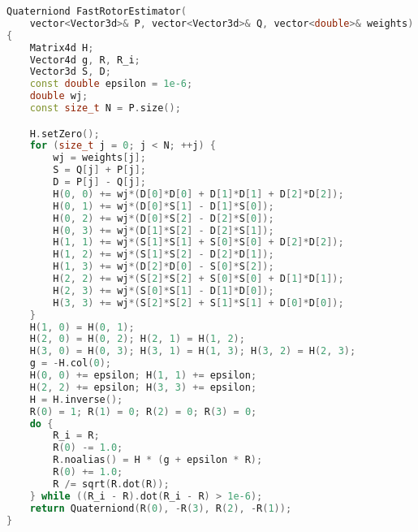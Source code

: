 \documentclass{birkjour}
\numberwithin{equation}{section}
\begin{document}
\begin{lstlisting}[language=C++, caption=C++ code for rotor estimation, basicstyle=\tiny, keywordstyle=\bfseries, label=lst:cppcode, morekeywords={Matrix4d,Vector4d,Vector3d,Quaterniond,sqrt}]
Quaterniond FastRotorEstimator(
	vector<Vector3d>& P, vector<Vector3d>& Q, vector<double>& weights)
{
	Matrix4d H;
	Vector4d g, R, R_i;
	Vector3d S, D;
	const double epsilon = 1e-6;
	double wj;
	const size_t N = P.size();

	H.setZero();
	for (size_t j = 0; j < N; ++j) {
		wj = weights[j];
		S = Q[j] + P[j];
		D = P[j] - Q[j];
		H(0, 0) += wj*(D[0]*D[0] + D[1]*D[1] + D[2]*D[2]);
		H(0, 1) += wj*(D[0]*S[1] - D[1]*S[0]);
		H(0, 2) += wj*(D[0]*S[2] - D[2]*S[0]);
		H(0, 3) += wj*(D[1]*S[2] - D[2]*S[1]);
		H(1, 1) += wj*(S[1]*S[1] + S[0]*S[0] + D[2]*D[2]);
		H(1, 2) += wj*(S[1]*S[2] - D[2]*D[1]);
		H(1, 3) += wj*(D[2]*D[0] - S[0]*S[2]);
		H(2, 2) += wj*(S[2]*S[2] + S[0]*S[0] + D[1]*D[1]);
		H(2, 3) += wj*(S[0]*S[1] - D[1]*D[0]);
		H(3, 3) += wj*(S[2]*S[2] + S[1]*S[1] + D[0]*D[0]);
	}
	H(1, 0) = H(0, 1);
	H(2, 0) = H(0, 2); H(2, 1) = H(1, 2);
	H(3, 0) = H(0, 3); H(3, 1) = H(1, 3); H(3, 2) = H(2, 3);
	g = -H.col(0);
	H(0, 0) += epsilon; H(1, 1) += epsilon; 
	H(2, 2) += epsilon; H(3, 3) += epsilon;
	H = H.inverse();
	R(0) = 1; R(1) = 0; R(2) = 0; R(3) = 0;
	do {
		R_i = R;
		R(0) -= 1.0;
		R.noalias() = H * (g + epsilon * R);
		R(0) += 1.0;
		R /= sqrt(R.dot(R));
	} while ((R_i - R).dot(R_i - R) > 1e-6);
	return Quaterniond(R(0), -R(3), R(2), -R(1));
}
\end{lstlisting}
\end{document}
